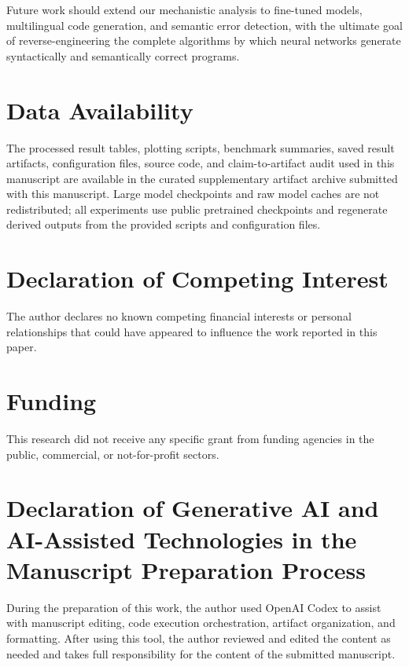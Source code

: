 \documentclass[preprint,12pt,authoryear]{elsarticle}
\newcommand{\submissionartifact}{curated supplementary artifact archive}
\begin{document}
Future work should extend our mechanistic analysis to fine-tuned models, multilingual code generation, and semantic error detection, with the ultimate goal of reverse-engineering the complete algorithms by which neural networks generate syntactically and semantically correct programs.

\section*{Data Availability}

The processed result tables, plotting scripts, benchmark summaries, saved result artifacts, configuration files, source code, and claim-to-artifact audit used in this manuscript are available in the \submissionartifact{} submitted with this manuscript. Large model checkpoints and raw model caches are not redistributed; all experiments use public pretrained checkpoints and regenerate derived outputs from the provided scripts and configuration files.

\section*{Declaration of Competing Interest}

The author declares no known competing financial interests or personal relationships that could have appeared to influence the work reported in this paper.

\section*{Funding}

This research did not receive any specific grant from funding agencies in the public, commercial, or not-for-profit sectors.

\section*{Declaration of Generative AI and AI-Assisted Technologies in the Manuscript Preparation Process}

During the preparation of this work, the author used OpenAI Codex to assist with manuscript editing, code execution orchestration, artifact organization, and formatting. After using this tool, the author reviewed and edited the content as needed and takes full responsibility for the content of the submitted manuscript.

\appendix
\end{document}
